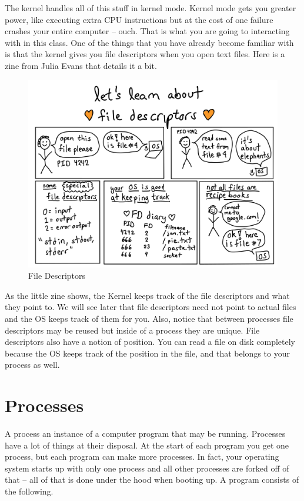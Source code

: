 The kernel handles all of this stuff in kernel mode.
Kernel mode gets you greater power, like executing extra CPU instructions but at the cost of one failure crashes your entire computer -- ouch.
That is what you are going to interacting with in this class.
One of the things that you have already become familiar with is that the kernel gives you file descriptors when you open text files.
Here is a zine from Julia Evans that details it a bit.

\begin{figure}[htbp]
  \centering
  \includegraphics[width=.8\textwidth]{processes/images/file-descriptors.png}
  \caption{File Descriptors}
\end{figure}

As the little zine shows, the Kernel keeps track of the file descriptors and what they point to.
We will see later that file descriptors need not point to actual files and the OS keeps track of them for you.
Also, notice that between processes file descriptors may be reused but inside of a process they are unique.
File descriptors also have a notion of position. You can read a file on disk completely because the OS keeps track of the position in the file, and that belongs to your process as well.

\section{Processes}

A process an instance of a computer program that may be running.
Processes have a lot of things at their disposal.
At the start of each program you get one process, but each program can make more processes.
In fact, your operating system starts up with only one process and all other processes are forked off of that -- all of that is done under the hood when booting up. A program consists of the following.

